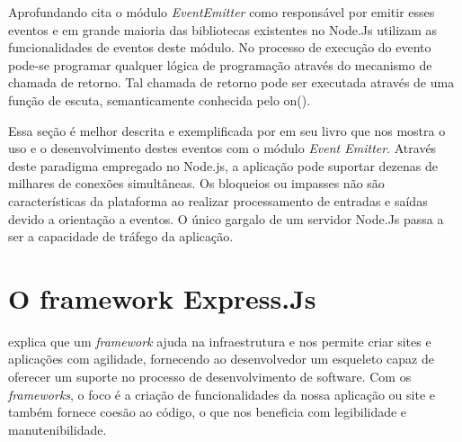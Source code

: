    

  
  
  Aprofundando  cita o módulo \textit{EventEmitter} como responsável por emitir esses eventos e em 
  grande maioria das bibliotecas existentes no Node.Js utilizam as funcionalidades de eventos deste módulo. 
  No processo de execução do evento pode-se programar qualquer lógica de programação através do 
  mecanismo de chamada de retorno. Tal chamada de retorno pode ser executada através de uma função de escuta, 
  semanticamente conhecida pelo on().
  
  Essa seção é melhor descrita e exemplificada por  
  em seu livro que nos mostra o uso e o desenvolvimento destes eventos com o módulo \textit{Event Emitter}.
  Através deste paradigma empregado no Node.js, a aplicação pode 
  suportar dezenas de milhares de conexões simultâneas. Os bloqueios ou impasses não são características da plataforma ao
  realizar processamento de entradas e saídas devido a orientação a eventos. \cite{Abernethy:2011}
  O único gargalo de um servidor Node.Js passa a ser a capacidade de tráfego da aplicação.\cite{Oliveira:2012} 


\section{O framework Express.Js}
\label{framework-express}

   explica que um \textit{framework} ajuda na infraestrutura e nos permite criar sites e aplicações
  com agilidade, fornecendo ao desenvolvedor um esqueleto capaz de oferecer um suporte no processo de desenvolvimento de
  software. Com os \textit{frameworks}, o foco é a criação de funcionalidades da nossa aplicação ou site e 
  também fornece coesão ao código, o que nos beneficia com legibilidade e manutenibilidade.

